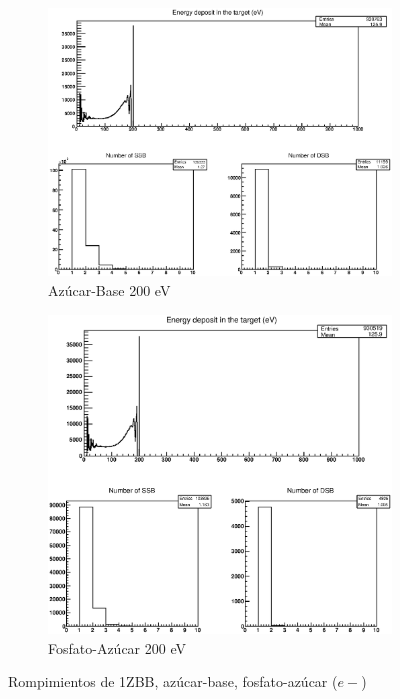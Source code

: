 \begin{figure}
\begin{subfigure}{.5\textwidth}
  \includegraphics[width=.9\linewidth]{./Figures/base2.eps}
  \caption{Azúcar-Base 200 eV}
  \label{fig:subei1ll}
\end{subfigure}%
\begin{subfigure}{.5\textwidth}
  \centering
  \includegraphics[width=.78\linewidth]{./Figures/1zbbe200ev.eps}
  \caption{Fosfato-Azúcar 200 eV}
  \label{fig:subei2ll}
\end{subfigure}
\caption{Rompimientos de 1ZBB, azúcar-base, fosfato-azúcar ($e-$)}
\label{fig:baek}
\end{figure}



